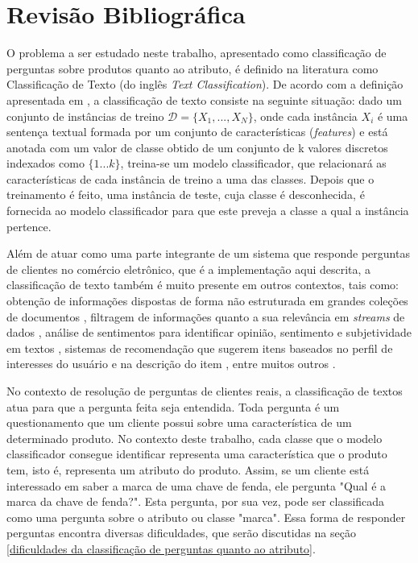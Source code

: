 \section{Revisão Bibliográfica}
\label{classificação}
O problema a ser estudado neste trabalho, apresentado como classificação de perguntas sobre produtos quanto ao atributo, é definido na literatura como Classificação de Texto (do inglês \textit{Text Classification}). De acordo com a definição apresentada em \cite{survey}, a classificação de texto consiste na seguinte situação: dado um conjunto de instâncias de treino $\mathcal{D} = \{X_1, ..., X_N\}$, onde cada instância $X_i$ é uma sentença textual formada por um conjunto de características (\textit{features}) e está anotada com um valor de classe obtido de um conjunto de k valores discretos indexados como $\{1...k\}$,  treina-se um modelo classificador, que relacionará as características de cada instância de treino a uma das classes. Depois que o treinamento é feito, uma instância de teste, cuja classe é desconhecida, é fornecida ao modelo classificador para que este preveja a classe a qual a instância pertence.

Além de atuar como uma parte integrante de um sistema que responde perguntas de clientes no comércio eletrônico, que é a implementação aqui descrita, a classificação de texto também é muito presente em outros contextos, tais como: obtenção de informações dispostas de forma não estruturada em grandes coleções de documentos \cite{info-retrieval}, filtragem de informações quanto a sua relevância em \textit{streams} de dados \cite{info-filtering}, análise de sentimentos para identificar opinião, sentimento e subjetividade em textos \cite{sentiment-analysis}, sistemas de recomendação que sugerem itens baseados no perfil de interesses do usuário e na descrição do item \cite{recommender-systems}, entre muitos outros \cite{survey2}.

No contexto de resolução de perguntas de clientes reais, a classificação de textos atua para que a pergunta feita seja entendida. Toda pergunta é um questionamento que um cliente possui sobre uma característica de um determinado produto. No contexto deste trabalho, cada classe que o modelo classificador consegue identificar representa uma característica que o produto tem, isto é, representa um atributo do produto. Assim, se um cliente está interessado em saber a marca de uma chave de fenda, ele pergunta "Qual é a marca da chave de fenda?". Esta pergunta, por sua vez, pode ser classificada como uma pergunta sobre o atributo ou classe "marca". Essa forma de responder perguntas encontra diversas dificuldades, que serão discutidas na seção \ref{dificuldades da classificação de perguntas quanto ao atributo}.

